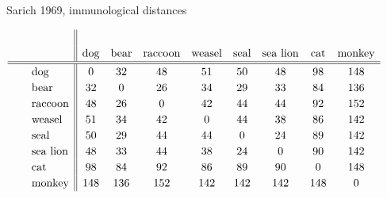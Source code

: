 \documentclass[bluish,slideColor,colorBG,pdf]{prosper}
\begin{document}
\begin{slide}[Replace]{Sarich 1969, immunological distances}
\bigskip

\noindent
\[
\renewcommand{\arraystretch}{1.2}
\hspace*{0in}\hspace{-0.3in}\mathsf{\begin{array}{c l || c c c  c  c  c  c c}
   &        &           &            &               &              &               &                   &           &            \\
   &        & {\rm dog} & {\rm bear} & {\rm raccoon} & {\rm weasel} & {\rm seal} & {\rm sea~lion} & {\rm cat} & {\rm monkey}\\
\hline
\hline
 & {\rm dog}     &    0 & 32 & 48 & 51 & 50 & 48 & 98 &148\\
 & {\rm bear}    &   32 &  0 & 26 & 34 & 29 & 33 & 84 &136\\
 & {\rm raccoon} &   48 & 26 &  0 & 42 & 44 & 44 & 92 &152\\
 & {\rm weasel}  &   51 & 34 & 42 &  0 & 44 & 38 & 86 &142\\
~~ & {\rm seal}    &   50 & 29 & 44 & 44 &  0 & 24 & 89 & 142\\
 & {\rm sea~lion}&  48 & 33 & 44 & 38 & 24 &  0 & 90 & 142\\
 & {\rm cat}     &   98 & 84 & 92 & 86 &  89 &  90 &  0 &148\\
 & {\rm monkey}  &  148 &136 &152 &142 & 142 & 142 &148 &  0
\end{array}
}\]

\end{slide}
\end{document}
